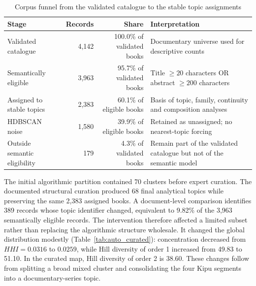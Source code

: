 \documentclass[futureinternet,article,submit,moreauthors]{Definitions/mdpi}
\begin{document}
\begin{table}[htbp]
\caption{Corpus funnel from the validated catalogue to the stable topic assignments}\label{tab:funnel}
\small
\begin{tabularx}{\textwidth}{@{}p{}rrY@{}}
\toprule
Stage & Records & Share & Interpretation \\
\midrule
Validated catalogue & 4,142 & 100.0\% of validated books & Documentary universe used for descriptive counts \\
Semantically eligible & 3,963 & 95.7\% of validated books & Title $\geq20$ characters OR abstract $\geq200$ characters \\
Assigned to stable topics & 2,383 & 60.1\% of eligible books & Basis of topic, family, continuity and composition analyses \\
HDBSCAN noise & 1,580 & 39.9\% of eligible books & Retained as unassigned; no nearest-topic forcing \\
Outside semantic eligibility & 179 & 4.3\% of validated books & Remain part of the validated catalogue but not of the semantic model \\
\bottomrule
\end{tabularx}
\end{table}

The initial algorithmic partition contained 70 clusters before expert curation. The documented structural curation produced 68 final analytical topics while preserving the same 2,383 assigned books. A document-level comparison identifies 389 records whose topic identifier changed, equivalent to 9.82\% of the 3,963 semantically eligible records. The intervention therefore affected a limited subset rather than replacing the algorithmic structure wholesale. It changed the global distribution modestly (Table~\ref{tab:auto_curated}): concentration decreased from $HHI=0.0316$ to $0.0259$, while Hill diversity of order 1 increased from 49.83 to 51.10. In the curated map, Hill diversity of order 2 is 38.60. These changes follow from splitting a broad mixed cluster and consolidating the four Kipu segments into a documentary-series topic.
\end{document}
